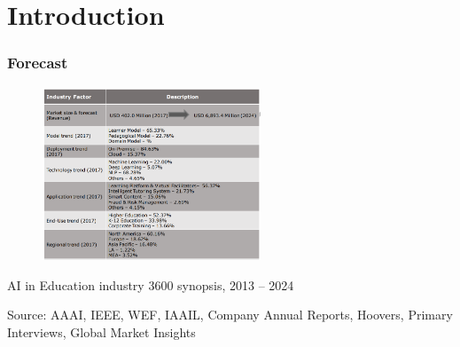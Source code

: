 \documentclass{beamer}
\begin{document}
\section{Introduction} %
\begin{frame}
\frametitle{Forecast}

\begin{center}
	

		\begin{figure}
			\includegraphics[width=65mm]{market2.png}
				
			
		\end{figure}
{\footnotesize 	AI in Education industry 3600 synopsis, 2013 – 2024}
	
{\tiny Source: AAAI, IEEE, WEF, IAAIL, Company Annual Reports, Hoovers, Primary Interviews, Global Market Insights}
\end{center}




\end{frame}
\end{document}
